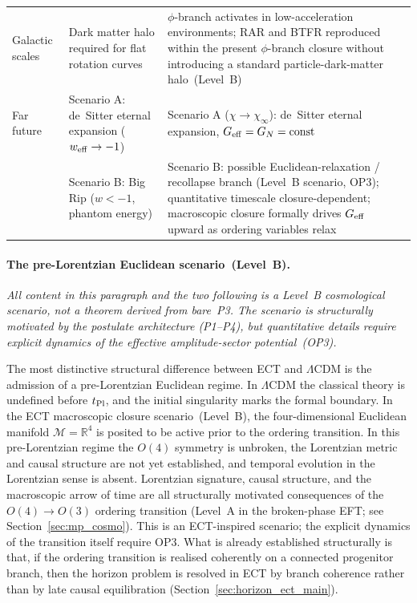\documentclass[11pt,a4paper]{article}
\numberwithin{equation}{section}
\begin{document}
\begin{longtable}{@{}p{}p{}p{}@{}}
Galactic scales & Dark matter halo required for flat rotation curves &
  $\phi$-branch activates in low-acceleration environments;
  RAR and BTFR reproduced within the present $\phi$-branch
  closure without introducing a standard particle-dark-matter
  halo~(Level~B) \\
Far future &
  Scenario A: de~Sitter eternal expansion ($w_{\rm eff}\to-1$) &
  Scenario A ($\chi\to\chi_\infty$): de~Sitter eternal expansion,
  $G_{\rm eff}=G_N=\text{const}$ \\
  & Scenario B: Big Rip ($w<-1$, phantom energy) &
  Scenario B: possible Euclidean-relaxation / recollapse branch
  (Level~B scenario, OP3); quantitative timescale
  closure-dependent; macroscopic closure formally drives
  $G_{\rm eff}$ upward as ordering variables relax \\

\end{longtable}

\paragraph{The pre-Lorentzian Euclidean scenario~(Level~B).}

\textit{All content in this paragraph and the two following is
a Level~B cosmological scenario, not a theorem derived from bare~P3.
The scenario is structurally motivated by the postulate architecture
(P1--P4), but quantitative details require explicit dynamics of the
effective amplitude-sector potential~(OP3).}

The most distinctive structural difference between ECT and $\Lambda$CDM
is the admission of a pre-Lorentzian Euclidean regime.
In $\Lambda$CDM the classical theory is undefined before $t_{\rm Pl}$,
and the initial singularity marks the formal boundary.
In the ECT macroscopic closure scenario~(Level~B), the four-dimensional
Euclidean manifold $\mathcal{M}=\mathbb{R}^4$ is posited to be active
prior to the ordering transition.  In this pre-Lorentzian regime the
$O(4)$ symmetry is unbroken, the Lorentzian metric and causal structure
are not yet established, and temporal evolution in the Lorentzian sense
is absent.  Lorentzian signature, causal structure, and the macroscopic
arrow of time are all structurally motivated consequences of the
$O(4)\to O(3)$ ordering transition (Level~A in the broken-phase EFT;
see Section~\ref{sec:mp_cosmo}).
This is an ECT-inspired scenario; the explicit dynamics of the transition
itself require OP3.
What is already established structurally is that, if the ordering
transition is realised coherently on a connected progenitor branch, then
the horizon problem is resolved in ECT by branch coherence rather than by
late causal equilibration (Section~\ref{sec:horizon_ect_main}).
\end{document}
